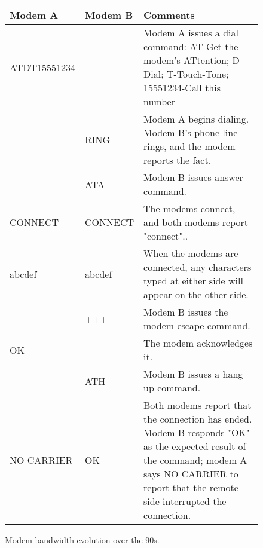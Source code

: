 \par
 \begin{figure}[H]
\centering  
\begin{tabularx}{\textwidth}{ L{0.2} L{0.15} L{0.65}}
  \toprule
  \textbf{Modem A} & \textbf{Modem B} & \textbf{Comments} \\
  \toprule 
   
    ATDT15551234 &	&	Modem A issues a dial command: AT-Get the modem's ATtention; D-Dial; T-Touch-Tone; 15551234-Call this number\\
    \toprule 
      & RING	& Modem A begins dialing. Modem B's phone-line rings, and the modem reports the fact.\\
      \toprule 
    & ATA	& Modem B issues answer command.\\
    \toprule 
    CONNECT	& CONNECT	& The modems connect, and both modems report "connect"..\\
    abcdef	& abcdef	& When the modems are connected, any characters typed at either side will appear on the other side.\\
    \toprule 
    & +++	& Modem B issues the modem escape command.\\
    \toprule 
     OK &	& The modem acknowledges it.\\
    \toprule 
    & ATH	& Modem B issues a hang up command.\\
    \toprule 
    NO CARRIER &	OK	& Both modems report that the connection has ended. Modem B responds "OK" as the expected result of the command; modem A says NO CARRIER to report that the remote side interrupted the connection.\\
   \toprule
\end{tabularx}
\caption{Modem bandwidth evolution over the 90s.}
\end{figure}
\par
{}